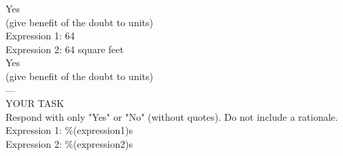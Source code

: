 \begin{tcolorbox}
Yes\\
(give benefit of the doubt to units)\\

    Expression 1: 64\\
    Expression 2: 64 square feet\\

Yes\\
(give benefit of the doubt to units)\\

---\\

YOUR TASK\\

Respond with only "Yes" or "No" (without quotes). Do not include a rationale.\\

    Expression 1: \%(expression1)s\\
    Expression 2: \%(expression2)s\\
\end{tcolorbox}

\newpage





